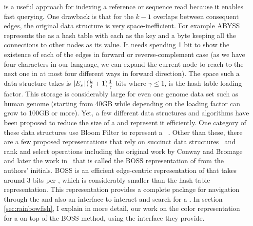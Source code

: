 \dbg is a useful approach for indexing a reference or sequence read because it enables fast querying. One drawback is that for the $k-1$ overlaps between consequent edges, the original data structure is very space-inefficient. For example ABYSS~\cite{simpson2009abyss} represents the \dbg as a hash table with each \kmer as the key and a byte keeping all the connections to other nodes as its value. It needs spending 1 bit to show the existence of each of the edges in forward or reverse-complement case (as we have four characters in our language, we can expand the current node to reach to the next one in at most four different ways in forward direction). The space such a data structure takes is $\left|E_s\right|(\frac{k}{4}+1)\frac{1}{\gamma}$ bits where $\gamma \leq 1$, is the hash table loading factor. This storage is considerably large for even one genome data set such as human genome (starting from 40GB while depending on the loading factor can grow to 100GB or more). Yet, a few different data structures and algorithms have been proposed to reduce the size of a \dbg and represent it efficiently. One category of these data structures use Bloom Filter to represent a \dbg~\cite{pell2012scaling,salikhov2013using,chikhi2012space,chikhi2013space,holley2016bloom}. Other than these, there are a few proposed representations that rely on succinct data structures~\cite{gbmp2014sea} and rank and select operations including the original work by Conway and Bromage~\cite{conway2011succinct} and later the work in~\cite{BoweOn12} that is called the BOSS representation of \dbg from the authors’ initials. BOSS is an efficient edge-centric representation of \dbg that takes around 3 bits per \kmer, which is considerably smaller than the hash table representation. This representation provides a complete package for navigation through the \dbg and also an interface to interact and search for a \kmer. In section \ref{sec:rainbowfish}, I explain in more detail, our work on the color representation for a \dbg on top of the BOSS method, using the interface they provide.


